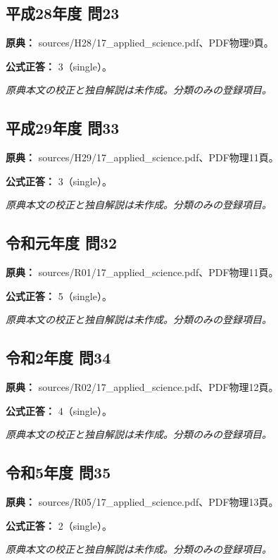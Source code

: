 \subsection{平成28年度 問23}
\label{q:h28-reg-applied-23}

\noindent\textbf{原典：} sources/H28/17\_applied\_science.pdf、PDF物理9頁。

\textbf{公式正答：} 3（single）。

\par\textit{原典本文の校正と独自解説は未作成。分類のみの登録項目。}

\subsection{平成29年度 問33}
\label{q:h29-reg-applied-33}

\noindent\textbf{原典：} sources/H29/17\_applied\_science.pdf、PDF物理11頁。

\textbf{公式正答：} 3（single）。

\par\textit{原典本文の校正と独自解説は未作成。分類のみの登録項目。}

\subsection{令和元年度 問32}
\label{q:r01-reg-applied-32}

\noindent\textbf{原典：} sources/R01/17\_applied\_science.pdf、PDF物理11頁。

\textbf{公式正答：} 5（single）。

\par\textit{原典本文の校正と独自解説は未作成。分類のみの登録項目。}

\subsection{令和2年度 問34}
\label{q:r02-reg-applied-34}

\noindent\textbf{原典：} sources/R02/17\_applied\_science.pdf、PDF物理12頁。

\textbf{公式正答：} 4（single）。

\par\textit{原典本文の校正と独自解説は未作成。分類のみの登録項目。}

\subsection{令和5年度 問35}
\label{q:r05-reg-applied-35}

\noindent\textbf{原典：} sources/R05/17\_applied\_science.pdf、PDF物理13頁。

\textbf{公式正答：} 2（single）。

\par\textit{原典本文の校正と独自解説は未作成。分類のみの登録項目。}
